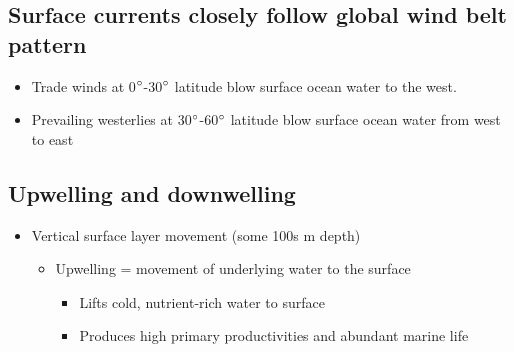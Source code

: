 \subsection{Surface currents closely follow global wind belt pattern}

\begin{itemize}
    \item Trade winds at 0$\degree$-30$\degree$ latitude
        blow surface ocean water to the west.
    \item Prevailing westerlies at 30$\degree$-60$\degree$
        latitude blow surface ocean water from west to east
\end{itemize}

\subsection{Upwelling and downwelling}

\begin{itemize}
    \item Vertical surface layer movement (some 100s m depth)
        \begin{itemize}
            \item Upwelling = movement of underlying water to the surface
                \begin{itemize}
                    \item Lifts cold, nutrient-rich water to surface
                    \item Produces high primary productivities and abundant
                        marine life
                \end{itemize}
        \end{itemize}
\end{itemize}

